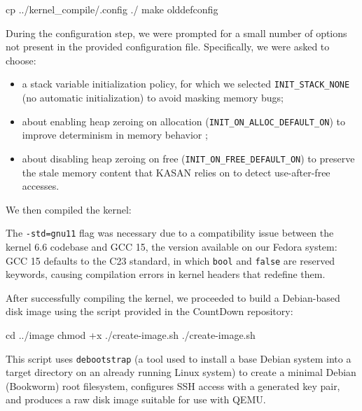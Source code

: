 \begin{bashlncode}
cp ../kernel_compile/.config ./
make olddefconfig
\end{bashlncode}

\noindent During the configuration step, we were prompted for a small number of options not present in the provided configuration file. Specifically, we were asked to choose:
\begin{itemize}
    \item a stack variable initialization policy, for which we selected \texttt{INIT\_STACK\_NONE} \cite{bib:config-init-stack-none} (no automatic initialization) to avoid masking memory bugs;

    \item about enabling heap zeroing on allocation (\texttt{INIT\_ON\_ALLOC\_DEFAULT\_ON}) to improve determinism in memory behavior \cite{bib:config-init-on-alloc-default-on};

    \item about disabling heap zeroing on free (\texttt{INIT\_ON\_FREE\_DEFAULT\_ON}) \cite{bib:config-init-on-free-default-on} to preserve the stale memory content that KASAN relies on to detect use-after-free accesses.
\end{itemize}
We then compiled the kernel:


\noindent The \texttt{-std=gnu11} flag was necessary due to a compatibility issue between the kernel 6.6 codebase and GCC 15, the version available on our Fedora system: GCC 15 defaults to the C23 standard, in which \texttt{bool} and \texttt{false} are reserved keywords, causing compilation errors in kernel headers that redefine them.

After successfully compiling the kernel, we proceeded to build a Debian-based disk image using the script provided in the CountDown repository:

\begin{bashlncode}
cd ../image
chmod +x ./create-image.sh
./create-image.sh
\end{bashlncode}

\noindent This script uses \texttt{debootstrap} \cite{bib:debootstrap} (a tool used to install a base Debian system into a target directory on an already running Linux system) to create a minimal Debian (Bookworm) root filesystem, configures SSH access with a generated key pair, and produces a raw disk image suitable for use with QEMU.

